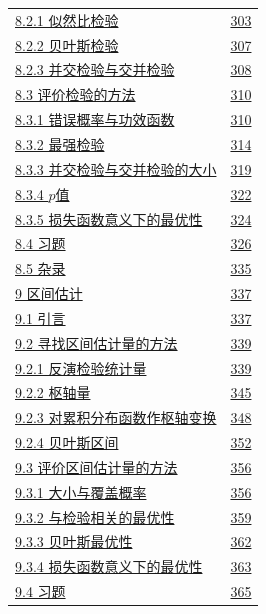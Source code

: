 \begin{longtable}{@{}p{}r@{}}
\hyperref[sec:8.2.1]{8.2.1 似然比检验} & \hyperref[sec:8.2.1]{303} \\
\hyperref[sec:8.2.2]{8.2.2 贝叶斯检验} & \hyperref[sec:8.2.2]{307} \\
\hyperref[sec:8.2.3]{8.2.3 并交检验与交并检验} & \hyperref[sec:8.2.3]{308} \\
\hyperref[sec:8.3]{8.3 评价检验的方法} & \hyperref[sec:8.3]{310} \\
\hyperref[sec:8.3.1]{8.3.1 错误概率与功效函数} & \hyperref[sec:8.3.1]{310} \\
\hyperref[sec:8.3.2]{8.3.2 最强检验} & \hyperref[sec:8.3.2]{314} \\
\hyperref[sec:8.3.3]{8.3.3 并交检验与交并检验的大小} & \hyperref[sec:8.3.3]{319} \\
\hyperref[sec:8.3.4]{8.3.4 $p$值} & \hyperref[sec:8.3.4]{322} \\
\hyperref[sec:8.3.5]{8.3.5 损失函数意义下的最优性} & \hyperref[sec:8.3.5]{324} \\
\hyperref[sec:8.4]{8.4 习题} & \hyperref[sec:8.4]{326} \\
\hyperref[sec:8.5]{8.5 杂录} & \hyperref[sec:8.5]{335} \\
\hyperref[sec:9]{9 区间估计} & \hyperref[sec:9]{337} \\
\hyperref[sec:9.1]{9.1 引言} & \hyperref[sec:9.1]{337} \\
\hyperref[sec:9.2]{9.2 寻找区间估计量的方法} & \hyperref[sec:9.2]{339} \\
\hyperref[sec:9.2.1]{9.2.1 反演检验统计量} & \hyperref[sec:9.2.1]{339} \\
\hyperref[sec:9.2.2]{9.2.2 枢轴量} & \hyperref[sec:9.2.2]{345} \\
\hyperref[sec:9.2.3]{9.2.3 对累积分布函数作枢轴变换} & \hyperref[sec:9.2.3]{348} \\
\hyperref[sec:9.2.4]{9.2.4 贝叶斯区间} & \hyperref[sec:9.2.4]{352} \\
\hyperref[sec:9.3]{9.3 评价区间估计量的方法} & \hyperref[sec:9.3]{356} \\
\hyperref[sec:9.3.1]{9.3.1 大小与覆盖概率} & \hyperref[sec:9.3.1]{356} \\
\hyperref[sec:9.3.2]{9.3.2 与检验相关的最优性} & \hyperref[sec:9.3.2]{359} \\
\hyperref[sec:9.3.3]{9.3.3 贝叶斯最优性} & \hyperref[sec:9.3.3]{362} \\
\hyperref[sec:9.3.4]{9.3.4 损失函数意义下的最优性} & \hyperref[sec:9.3.4]{363} \\
\hyperref[sec:9.4]{9.4 习题} & \hyperref[sec:9.4]{365} \\

\end{longtable}
